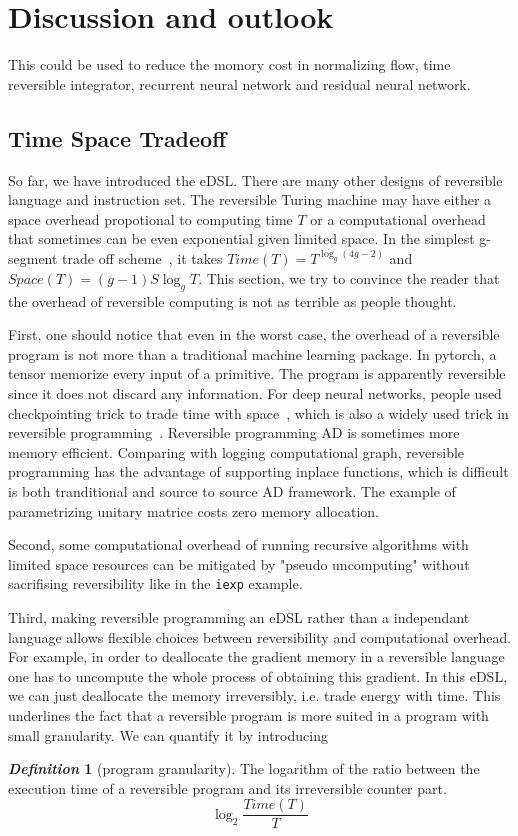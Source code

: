 \documentclass[aps,twocolumn,longbibliography,english,superscriptaddress,prr]{revtex4-1}
\newcommand{\<}{\langle}
\renewcommand{\>}{\rangle}
\theoremstyle{definition}\newtheorem{definition}{\textit{Definition}}
\begin{document}
\section{Discussion and outlook}\label{sec:discussion}

This could be used to reduce the momory cost in normalizing flow, time reversible integrator, recurrent neural network and residual neural network.
\subsection{Time Space Tradeoff}\label{sec:timespace}
So far, we have introduced the eDSL. There are many other designs of reversible language and instruction set.
The reversible Turing machine may have either a space overhead propotional to computing time $T$ or a computational overhead that sometimes can be even exponential given limited space.
In the simplest g-segment trade off scheme~\cite{Bennett1989,Levine1990}, it takes $Time(T) = T^{\log _g(4g-2)}$ and $Space(T) = (g-1)S\log_g T$.
This section, we try to convince the reader that the overhead of reversible computing is not as terrible as people thought.

First, one should notice that even in the worst case, the overhead of a reversible program is not more than a traditional machine learning package. In pytorch, a tensor memorize every input of a primitive. The program is apparently reversible since it does not discard any information.
For deep neural networks, people used checkpointing trick to trade time with space~\cite{Chen2016}, which is also a widely used trick in reversible programming~\cite{Perumalla2013}. Reversible programming AD is sometimes more memory efficient. Comparing with logging computational graph, reversible programming has the advantage of supporting inplace functions, which is difficult is both tranditional and source to source AD framework. The example of parametrizing unitary matrice costs zero memory allocation.

Second, some computational overhead of running recursive algorithms with limited space resources can be mitigated by "pseudo uncomputing" without sacrifising reversibility like in the \texttt{iexp} example.

Third, making reversible programming an eDSL rather than a independant language allows flexible choices between reversibility and computational overhead. For example, in order to deallocate the gradient memory in a reversible language one has to uncompute the whole process of obtaining this gradient.
In this eDSL, we can just deallocate the memory irreversibly, i.e. trade energy with time. This underlines the fact that a reversible program is more suited in a program with small granularity. We can quantify it by introducing
\begin{definition}[program granularity]
    The logarithm of the ratio between the execution time of a reversible program and its irreversible counter part.
    \begin{equation}
        \log_2 \frac{Time(T)}{T}
    \end{equation}
\end{definition}
\end{document}
